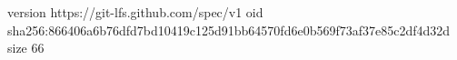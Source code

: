version https://git-lfs.github.com/spec/v1
oid sha256:866406a6b76dfd7bd10419c125d91bb64570fd6e0b569f73af37e85c2df4d32d
size 66
